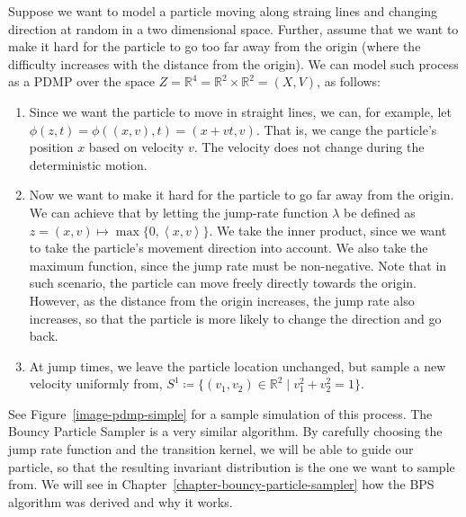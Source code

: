 \documentclass[report.tex]{subfiles}
\begin{document}
Suppose we want to model a particle moving along straing lines and changing
direction at random in a two dimensional space. Further, assume that we want to
make it hard for the particle to go too far away from the origin (where the difficulty
increases with the distance from the origin).
We can model such process as a PDMP over the space
$Z = \mathbb{R}^{4} = \mathbb{R}^{2} \times \mathbb{R}^{2} = (X, V)$,
as follows:
\begin{enumerate}
  \item Since we want the particle to move in straight lines, we can, for example,
    let $\phi(z, t) = \phi((x,v), t) = (x + vt, v)$. That is, we cange the particle's
    position $x$ based on velocity $v$. The velocity does not change during the
    deterministic motion.
  \item Now we want to make it hard for the particle to go far away from the origin.
    We can achieve that by letting the jump-rate function $\lambda$ be defined as
    \mbox{$z = (x, v) \mapsto \max\{0, \left\langle x, v \right\rangle\}$}.
    We take the inner product, since we want to take the particle's movement
    direction into account. We also take the maximum function, since the jump rate
    must be non-negative. Note that in such scenario,
    the particle can move freely directly towards the origin. However, as the
    distance from the origin increases, the jump rate also increases, so that the
    particle is more likely to change the direction and go back.
  \item At jump times, we leave the particle location unchanged, but sample a new
    velocity uniformly from,
    $S^{1} \coloneqq \{(v_{1}, v_{2}) \in \mathbb{R}^{2} \mid v_{1}^{2} + v_{2}^2 = 1 \}$.
\end{enumerate}

See Figure~\ref{image-pdmp-simple} for a sample simulation of this process.
The Bouncy Particle Sampler is a very similar algorithm. By carefully choosing
the jump rate function and the transition kernel, we will be able to guide our
particle, so that the resulting invariant distribution is the one we want to sample from.
We will see in Chapter~\ref{chapter-bouncy-particle-sampler} how the BPS algorithm
was derived and why it works.
\end{document}

